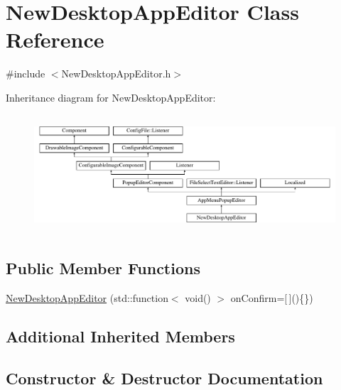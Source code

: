 \hypertarget{classNewDesktopAppEditor}{}\section{New\+Desktop\+App\+Editor Class Reference}
\label{classNewDesktopAppEditor}


{\ttfamily \#include $<$New\+Desktop\+App\+Editor.\+h$>$}

Inheritance diagram for New\+Desktop\+App\+Editor\+:\begin{figure}[H]
\begin{center}
\leavevmode
\includegraphics[height=4.444445cm]{classNewDesktopAppEditor}
\end{center}
\end{figure}
\subsection*{Public Member Functions}
\begin{DoxyCompactItemize}
\item 
\mbox{\hyperlink{classNewDesktopAppEditor_a2d375654544b15415ae2dafe6cbe019b}{New\+Desktop\+App\+Editor}} (std\+::function$<$ void() $>$ on\+Confirm=\mbox{[}$\,$\mbox{]}()\{\})
\end{DoxyCompactItemize}
\subsection*{Additional Inherited Members}


\subsection{Constructor \& Destructor Documentation}
\mbox{\label{classNewDesktopAppEditor_a2d375654544b15415ae2dafe6cbe019b}} 
